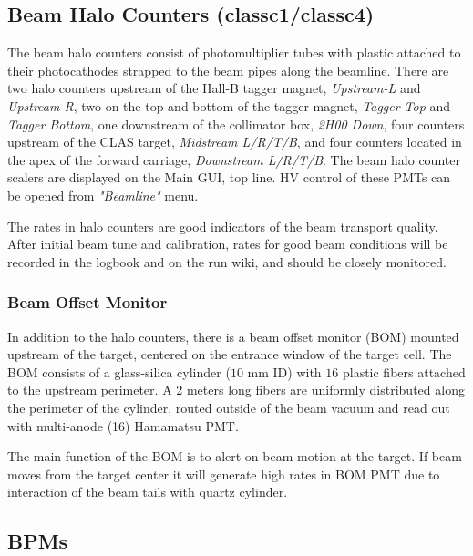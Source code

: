 \documentclass[12pt]{article}
\begin{document}
\subsection{Beam Halo Counters (classc1/classc4) \label{sec:scaler_a}}
\indent

The beam halo counters consist of photomultiplier tubes with plastic attached to their photocathodes strapped to the beam pipes along the beamline. There are two halo counters upstream of the Hall-B tagger magnet, \emph{Upstream-L} and \emph{Upstream-R}, two on the top and bottom of the tagger magnet, \emph{Tagger Top} and \emph{Tagger Bottom}, one downstream of the collimator box, \emph{2H00 Down}, four counters upstream of the CLAS target, \emph{Midstream L/R/T/B}, and four counters located in the apex of the forward carriage, \emph{Downstream L/R/T/B}. The beam halo counter scalers are displayed on the Main GUI, top line. HV control of these PMTs can be opened from \emph{"Beamline"} menu.

The rates in halo counters are good indicators of the beam transport quality. After initial beam tune and calibration, rates for good beam conditions will be recorded in the logbook and on the run wiki, and should be closely monitored. 

\subsubsection{Beam Offset Monitor}
\indent

In addition to the halo counters, there is a beam offset monitor (BOM) mounted upstream of the target, centered on the entrance window of the target cell. The BOM consists of a glass-silica cylinder ($10$ mm ID) with $16$ plastic fibers attached to the upstream perimeter. A 2 meters long fibers are uniformly distributed along the perimeter of the cylinder, routed outside of the beam vacuum and read out with multi-anode (16) Hamamatsu PMT. 

The main function of the BOM is to alert on beam motion at the target. If beam moves from the target center it will generate high rates in BOM PMT due to interaction of the beam tails with quartz cylinder. 


\subsection{BPMs}
\label{sec:bpm}
\indent
\end{document}
